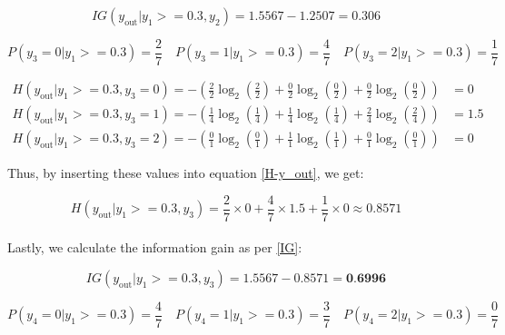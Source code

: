 \documentclass[12pt]{article}
\begin{document}
\begin{enumerate}[leftmargin=\labelsep]
\begin{equation*}
    IG(y_{\text{out}} | y_1 >= 0.3, y_2) = 1.5567 - 1.2507 = 0.306
\end{equation*}

\begin{equation*}
    P(y_3 = 0|y_1 >= 0.3) = \frac{2}{7} \quad
    P(y_3 = 1|y_1 >= 0.3) = \frac{4}{7} \quad
    P(y_3 = 2|y_1 >= 0.3) = \frac{1}{7} \quad
\end{equation*}

\begin{equation*}
    \begin{aligned}
        H(y_{\text{out}}|y_1 >= 0.3, y_3 = 0) = - \left( \frac{2}{2} \log_2 \left( \frac{2}{2} \right) + \frac{0}{2} \log_2 \left( \frac{0}{2} \right) + \frac{0}{2} \log_2 \left( \frac{0}{2} \right) \right) &= 0 
        \\
        H(y_{\text{out}}|y_1 >= 0.3, y_3 = 1) = - \left( \frac{1}{4} \log_2 \left( \frac{1}{4} \right) + \frac{1}{4} \log_2 \left( \frac{1}{4} \right) + \frac{2}{4} \log_2 \left( \frac{2}{4} \right) \right) &= 1.5
        \\
        H(y_{\text{out}}|y_1 >= 0.3, y_3 = 2) = - \left( \frac{0}{1} \log_2 \left( \frac{0}{1} \right) + \frac{1}{1} \log_2 \left( \frac{1}{1} \right) + \frac{0}{1} \log_2 \left( \frac{0}{1} \right) \right) &= 0
    \end{aligned}
\end{equation*}

Thus, by inserting these values into equation \eqref{H-y_out}, we get:

\begin{equation*}
    H(y_{\text{out}}|y_1 >= 0.3, y_3) = \frac{2}{7} \times  0 + \frac{4}{7} \times 1.5 + \frac{1}{7} \times 0 \approx 0.8571 
\end{equation*}
\\
Lastly, we calculate the information gain as per \eqref{IG}:

\begin{equation*}
    IG(y_{\text{out}} | y_1 >= 0.3, y_3) = 1.5567 - 0.8571 = \textbf{0.6996}
\end{equation*}

\begin{equation*}
    P(y_4 = 0|y_1 >= 0.3) = \frac{4}{7} \quad
    P(y_4 = 1|y_1 >= 0.3) = \frac{3}{7} \quad
    P(y_4 = 2|y_1 >= 0.3) = \frac{0}{7} \quad
\end{equation*}


\end{enumerate}
\end{document}
